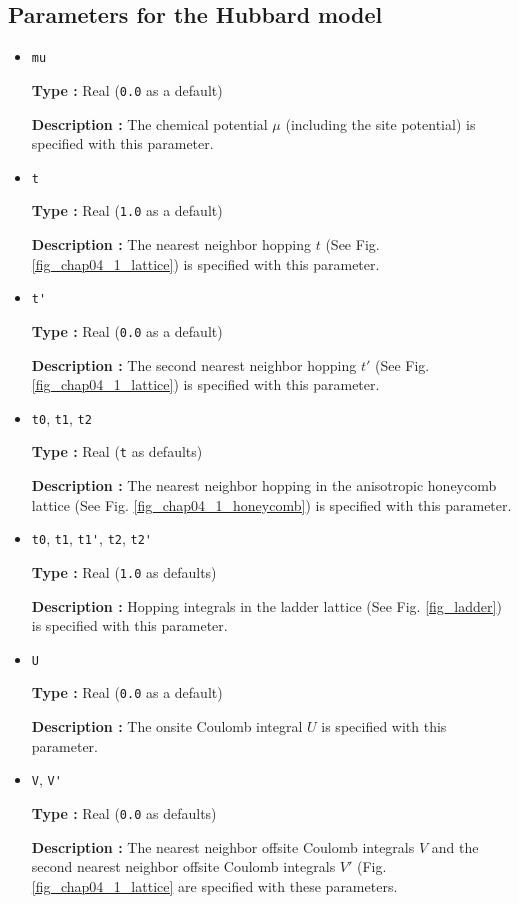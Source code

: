 \subsection{Parameters for the Hubbard model}
\begin{itemize}
\item \verb|mu|

{\bf Type :} Real (\verb|0.0| as a default)

{\bf Description :} The chemical potential $\mu$ (including the site potential)
is specified with this parameter.

\item \verb|t|

{\bf Type :} Real (\verb|1.0| as a default)

{\bf Description :} The nearest neighbor hopping $t$ (See Fig. \ref{fig_chap04_1_lattice})
is specified with this parameter.

\item \verb|t'|

{\bf Type :} Real (\verb|0.0| as a default)

{\bf Description :} The second nearest neighbor hopping $t'$ (See Fig. \ref{fig_chap04_1_lattice})
is specified with this parameter.

\item \verb|t0|, \verb|t1|, \verb|t2|

{\bf Type :} Real (\verb|t| as defaults)

{\bf Description :} The nearest neighbor hopping 
in the anisotropic honeycomb lattice 
(See Fig. \ref{fig_chap04_1_honeycomb})
is specified with this parameter.

\item \verb|t0|, \verb|t1|, \verb|t1'|, \verb|t2|, \verb|t2'|

{\bf Type :} Real (\verb|1.0| as defaults)

{\bf Description :} Hopping integrals
in the ladder lattice 
(See Fig. \ref{fig_ladder})
is specified with this parameter.

\item \verb|U|

{\bf Type :} Real (\verb|0.0| as a default)

{\bf Description :} The onsite Coulomb integral $U$ is specified with this parameter.

\item \verb|V|, \verb|V'|

{\bf Type :} Real (\verb|0.0| as defaults)

{\bf Description :} The nearest neighbor offsite Coulomb integrals $V$
and the second nearest neighbor offsite Coulomb integrals $V'$
(Fig. \ref{fig_chap04_1_lattice} are specified with these parameters.


\end{itemize}
